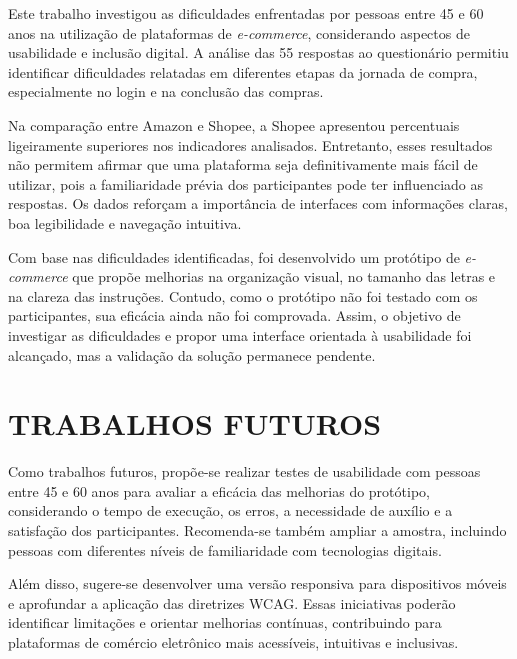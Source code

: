 \documentclass[12pt,a4paper]{article}
\begin{document}
Este trabalho investigou as dificuldades enfrentadas por pessoas entre 45 e 60 anos na utilização de plataformas de \textit{e-commerce}, considerando aspectos de usabilidade e inclusão digital. A análise das 55 respostas ao questionário permitiu identificar dificuldades relatadas em diferentes etapas da jornada de compra, especialmente no login e na conclusão das compras.

Na comparação entre Amazon e Shopee, a Shopee apresentou percentuais ligeiramente superiores nos indicadores analisados. Entretanto, esses resultados não permitem afirmar que uma plataforma seja definitivamente mais fácil de utilizar, pois a familiaridade prévia dos participantes pode ter influenciado as respostas. Os dados reforçam a importância de interfaces com informações claras, boa legibilidade e navegação intuitiva.

Com base nas dificuldades identificadas, foi desenvolvido um protótipo de \textit{e-com\-merce} que propõe melhorias na organização visual, no tamanho das letras e na clareza das instruções. Contudo, como o protótipo não foi testado com os participantes, sua eficácia ainda não foi comprovada. Assim, o objetivo de investigar as dificuldades e propor uma interface orientada à usabilidade foi alcançado, mas a validação da solução permanece pendente.

\section{TRABALHOS FUTUROS}

Como trabalhos futuros, propõe-se realizar testes de usabilidade com pessoas entre 45 e 60 anos para avaliar a eficácia das melhorias do protótipo, considerando o tempo de execução, os erros, a necessidade de auxílio e a satisfação dos participantes. Recomenda-se também ampliar a amostra, incluindo pessoas com diferentes níveis de familiaridade com tecnologias digitais.

Além disso, sugere-se desenvolver uma versão responsiva para dispositivos móveis e aprofundar a aplicação das diretrizes WCAG. Essas iniciativas poderão identificar limitações e orientar melhorias contínuas, contribuindo para plataformas de comércio eletrônico mais acessíveis, intuitivas e inclusivas.


\end{document}
